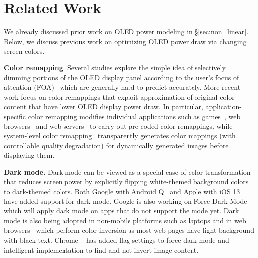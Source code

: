 \section{Related Work}
\label{sec:related}

We already discussed prior work on OLED power modeling in
\S\ref{sec:non_linear}. Below, we discuss previous work on optimizing
OLED power draw via changing screen colors.

{\bf Color remapping.}
Several studies explore the simple idea of selectively dimming portions
of the OLED display panel according to the user's focus of attention
(FOA)~\cite{tan:ubicom13,chen:hotpower14} which are generally hard to
predict accurately.
%
More recent work focus on color remappings that exploit
approximation of original color content that have lower OLED display
power draw. In particular, application-specific color remapping
modifies individual applications such as games~\cite{anand:mobisys11},
web browsers~\cite{dong:ispled09,li:esec15} and web
servers~\cite{li:icse2014} to carry out pre-coded color remappings,
while system-level color remapping~\cite{crayon:eurosys16}
transparently generates color mappings (with controllable
quality degradation) for dynamically generated images before
displaying them.

{\bf Dark mode.}
Dark mode can be viewed as a special case
of color transformation that reduces screen power
by explicitly flipping white-themed background colors to dark-themed colors.
Both Google with Android Q~\cite{darkmode:androidQ} and
Apple with iOS 13~\cite{darkmode:iOS13_1,darkmode:iOS13_2} have added support
for dark mode.  Google is also working on Force Dark
Mode~\cite{darkmode:forcedark} which will apply dark mode on apps
that do not support the mode yet.
%
Dark mode is also being adopted in non-mobile platforms such as
laptops and in web browsers~\cite{darkmode:web_browsers} which
perform color inversion as most web pages have light
background with black text.
Chrome ~\cite{darkmode:chrome} has added flag settings to force dark mode
and intelligent implementation to find and not invert image content.

